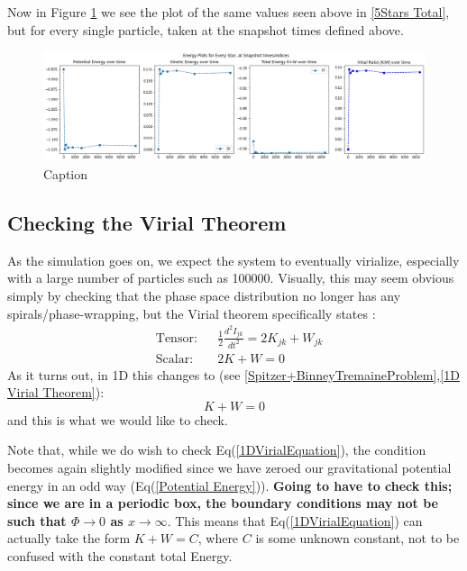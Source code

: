 \documentclass[oneside]{book}
\begin{document}
Now in Figure \ref{All Total Energies} we see the plot of the same values seen above in  \ref{5Stars Total}, but for every single particle, taken at the snapshot times defined above.
\begin{figure}[h]
    \centering
    \includegraphics[width=\textwidth]{Images/AllTotal.png}
    \caption{Caption}
    \label{All Total Energies}
\end{figure}

\subsection{Checking the Virial Theorem}
As the simulation goes on, we expect the system to eventually virialize, especially with a large number of particles such as 100000. Visually, this may seem obvious simply by checking that the phase space distribution no longer has any spirals/phase-wrapping, but the Virial theorem specifically states \cite{Binney&Tremaine}:
\begin{align}
    &\text{Tensor:} && \frac{1}{2}\frac{d^2 I_{jk}}{dt^2} = 2K_{jk} + W_{jk} \\
    &\text{Scalar:} && 2K+W=0
\end{align}
As it turns out, in 1D this changes to (see \cref{Spitzer+BinneyTremaineProblem},\cref{1D Virial Theorem}):
\begin{equation}
    K+W=0
    \label{1DVirialEquation}
\end{equation}
and this is what we would like to check.

Note that, while we do wish to check Eq(\ref{1DVirialEquation}), the condition becomes again slightly modified since we have zeroed our gravitational potential energy in an odd way (Eq(\ref{Potential Energy})). 
{\color{red}\textbf{Going to have to check this; since we are in a periodic box, the boundary conditions may not be such that $\Phi \rightarrow 0$ as $x \rightarrow \infty$}.
This means that Eq(\ref{1DVirialEquation}) can actually take the form $K+W = C$, where $C$ is some unknown constant, not to be confused with the constant total Energy.}
\end{document}
